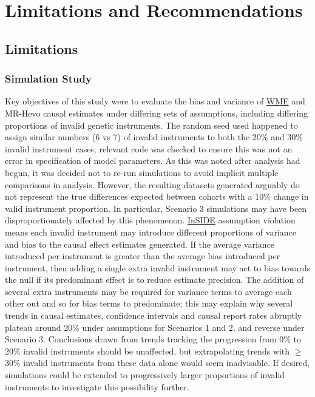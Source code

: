 \documentclass[
]{article}
\begin{document}
\newpage

\section{Limitations and Recommendations}\label{limitations-and-recommendations}

\subsection{Limitations}\label{limitations}

\subsubsection{Simulation Study}\label{lim-sim}

Key objectives of this study were to evaluate the bias and variance of \hyperref[acronyms_WME]{WME} and MR-Hevo causal estimates under differing sets of assumptions, including differing proportions of invalid genetic instruments. The random seed used happened to assign similar numbers (6 vs 7) of invalid instruments to both the 20\% and 30\% invalid instrument cases; relevant code was checked to ensure this was not an error in specification of model parameters. As this was noted after analysis had begun, it was decided not to re-run simulations to avoid implicit multiple comparisons in analysis. However, the resulting datasets generated arguably do not represent the true differences expected between cohorts with a 10\% change in valid instrument proportion. In particular, Scenario 3 simulations may have been disproportionately affected by this phenomenon. \hyperref[acronyms_InSIDE]{InSIDE} assumption violation means each invalid instrument may introduce different proportions of variance and bias to the causal effect estimates generated. If the average variance introduced per instrument is greater than the average bias introduced per instrument, then adding a single extra invalid instrument may act to bias towards the null if its predominant effect is to reduce estimate precision. The addition of several extra instruments may be required for variance terms to average each other out and so for bias terms to predominate; this may explain why several trends in causal estimates, confidence intervals and causal report rates abruptly plateau around 20\% under assumptions for Scenarios 1 and 2, and reverse under Scenario 3. Conclusions drawn from trends tracking the progression from 0\% to 20\% invalid instruments should be unaffected, but extrapolating trends with \(\ge\) 30\% invalid instruments from these data alone would seem inadvisable. If desired, simulations could be extended to progressively larger proportions of invalid instruments to investigate this possibility further.
\end{document}

